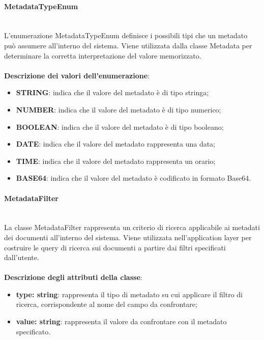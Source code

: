 \documentclass[a4paper,12pt]{article}
\begin{document}
{                \paragraph{MetadataTypeEnum}\label{par:MetadataTypeEnum}\mbox{}\\
                L'enumerazione MetadataTypeEnum definisce i possibili tipi che un metadato può assumere all'interno del sistema. Viene utilizzata dalla classe Metadata per determinare la corretta interpretazione del valore memorizzato.\\
                \\
                \textbf{Descrizione dei valori dell'enumerazione}:
                \begin{itemize}
                    \item \textbf{STRING}: indica che il valore del metadato è di tipo stringa;
                    \item \textbf{NUMBER}: indica che il valore del metadato è di tipo numerico;
                    \item \textbf{BOOLEAN}: indica che il valore del metadato è di tipo booleano;
                    \item \textbf{DATE}: indica che il valore del metadato rappresenta una data;
                    \item \textbf{TIME}: indica che il valore del metadato rappresenta un orario;
                    \item \textbf{BASE64}: indica che il valore del metadato è codificato in formato Base64.
                \end{itemize}
 
                \paragraph{MetadataFilter}\label{par:MetadataFilter}\mbox{}\\
                La classe MetadataFilter rappresenta un criterio di ricerca applicabile ai metadati dei documenti all'interno del sistema. Viene utilizzata nell'application layer per costruire le query di ricerca sui documenti a partire dai filtri specificati dall'utente.\\
                \\
                \textbf{Descrizione degli attributi della classe}:
                \begin{itemize}
                    \item \textbf{type: string}: rappresenta il tipo di metadato su cui applicare il filtro di ricerca, corrispondente al nome del campo da confrontare;
                    \item \textbf{value: string}: rappresenta il valore da confrontare con il metadato specificato.
                \end{itemize}
 
}
\end{document}
